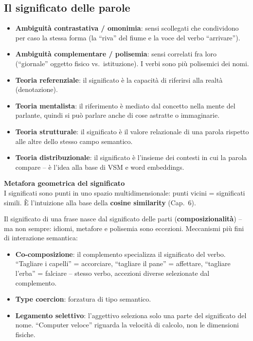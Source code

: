 \documentclass[11pt,a4paper]{article}
\newcommand{\formula}[2]{\begin{formulabox}\textbf{#1}\\[3pt]#2\end{formulabox}}
\begin{document}
\subsection*{Il significato delle parole}
\begin{itemize}
  \item \textbf{Ambiguit\`a contrastativa / omonimia}: sensi scollegati che condividono per caso la stessa forma (la ``riva'' del fiume e la voce del verbo ``arrivare'').
  \item \textbf{Ambiguit\`a complementare / polisemia}: sensi correlati fra loro (``giornale'' oggetto fisico vs.\ istituzione). I verbi sono pi\`u polisemici dei nomi.
  \item \textbf{Teoria referenziale}: il significato \`e la capacit\`a di riferirsi alla realt\`a (denotazione).
  \item \textbf{Teoria mentalista}: il riferimento \`e mediato dal concetto nella mente del parlante, quindi si pu\`o parlare anche di cose astratte o immaginarie.
  \item \textbf{Teoria strutturale}: il significato \`e il valore relazionale di una parola rispetto alle altre dello stesso campo semantico.
  \item \textbf{Teoria distribuzionale}: il significato \`e l'insieme dei contesti in cui la parola compare -- \`e l'idea alla base di VSM e word embeddings.
\end{itemize}

\formula{Metafora geometrica del significato}{I significati sono punti in uno spazio multidimensionale: punti vicini = significati simili. \`E l'intuizione alla base della \textbf{cosine similarity} (Cap.~6).}

Il significato di una frase nasce dal significato delle parti (\textbf{composizionalit\`a}) -- ma non sempre: idiomi, metafore e polisemia sono eccezioni. Meccanismi pi\`u fini di interazione semantica:
\begin{itemize}
  \item \textbf{Co-composizione}: il complemento specializza il significato del verbo. ``Tagliare i capelli'' = accorciare, ``tagliare il pane'' = affettare, ``tagliare l'erba'' = falciare -- stesso verbo, accezioni diverse selezionate dal complemento.
  \item \textbf{Type coercion}: forzatura di tipo semantico.
  \item \textbf{Legamento selettivo}: l'aggettivo seleziona solo una parte del significato del nome. ``Computer veloce'' riguarda la velocit\`a di calcolo, non le dimensioni fisiche.
\end{itemize}
\end{document}
